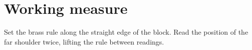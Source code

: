\documentclass[12pt,a4paper]{article}
\begin{document}
\section*{Working measure}
Set the brass rule along the straight edge of the block. Read the position of the far shoulder twice, lifting the rule between readings.
\end{document}
